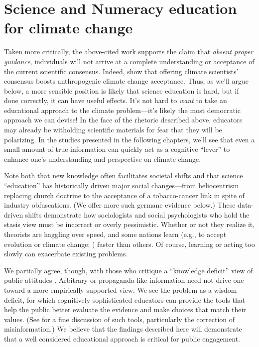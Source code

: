 \section{Science and Numeracy education for climate change}

Taken more critically, the above-cited work supports the claim that \emph{absent
proper guidance}, individuals will not arrive at a complete understanding or
acceptance of the current scientific consensus.  Indeed,
\textcite{lewandowsky_pivotal_2013} show that offering climate scientists'
consensus boosts anthropogenic climate change acceptance.  Thus, as we'll argue
below, a more sensible position is likely that science education is hard, but if
done correctly, it can have useful effects.  It's not hard to \emph{want} to
take an educational approach to the climate problem---it's likely the most
democratic approach we can devise! In the face of the rhetoric described above,
educators may already be witholding scientific materials for fear that they will
be polarizing. In the studies presented in the following chapters, we'll see
that even a small amount of true information can quickly act as a cognitive
``lever'' to enhance one's understanding and perspective on climate change.

Note both that new knowledge often facilitates societal shifts and that science
``education'' has historically driven major social changes—from heliocentrism
replacing church doctrine to the acceptance of a tobacco-cancer link in spite of
industry obfuscations. (We offer more such germane evidence below.) These
data-driven shifts demonstrate how sociologists and social psychologists who
hold the stasis view must be incorrect or overly pessimistic. Whether or not
they realize it, theorists are haggling over speed, and some nations learn
(e.g., to accept evolution or climate change; \cite{ranney_why_2012}) faster than others.
Of course, learning or acting too slowly can exacerbate existing problems.

We partially agree, though, with those who critique a ``knowledge deficit'' view
of public attitudes \parencite[cf.][]{dickson_case_2005}. Arbitrary or
propaganda-like information need not drive one toward a more empirically
supported view. We see the problem as a wisdom deficit, for which cognitively
sophisticated educators can provide the tools that help the public better
evaluate the evidence and make choices that match their values. (See
\cite{lewandowsky_misinformation_2012} for a fine discussion of such tools,
particularly the correction of misinformation.) We believe that the findings
described here will demonstrate that a well considered educational approach is
critical for public engagement.

